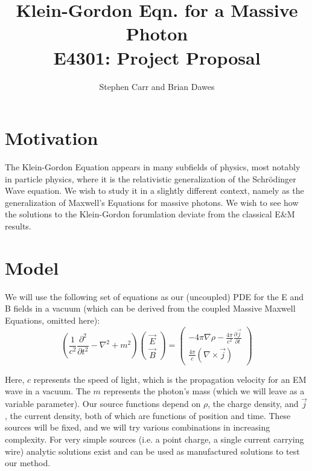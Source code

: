 \documentclass{article}
\begin{document}
\title{\vspace{-120 pt}\Large{Klein-Gordon Eqn. for a Massive Photon} \\ \vspace{0 pt} \large{E4301: Project Proposal}}
\author{Stephen Carr and Brian Dawes}
\maketitle

\section{Motivation}
The Klein-Gordon Equation appears in many subfields of physics, most notably in particle physics, where it is the relativistic generalization of the Schr\"odinger Wave equation. We wish to study it in a slightly different context, namely as the generalization of Maxwell's Equations for massive photons. We wish to see how the solutions to the Klein-Gordon forumlation deviate from the classical E\&M results.

\section{Model}
We will use the following set of equations as our (uncoupled) PDE for the E and B fields in a vacuum (which can be derived from the coupled Massive Maxwell Equations, omitted here):
\begin{equation}
\boxed{
\left(\frac{1}{c^2}\frac{\partial^2}{\partial t^2} - \nabla^2 + m^2\right)
\begin{pmatrix}
\vec{E} \\
\vec{B}
\end{pmatrix}
=
\begin{pmatrix}
-4\pi\nabla\rho - \frac{4\pi}{c^2}\frac{\partial\vec{j}}{\partial t} \\
\frac{4\pi}{c}(\nabla\times\vec{j})
\end{pmatrix}
}
\end{equation}

Here, $c$ represents the speed of light, which is the propagation velocity for an EM wave in a vacuum. The $m$ represents the photon's mass (which we will leave as a variable parameter). Our source functions depend on $\rho$, the charge density, and $\vec{j}$, the current density, both of which are functions of position and time. These sources will be fixed, and we will try various combinations in increasing complexity. For very simple sources (i.e. a point charge, a single current carrying wire) analytic solutions exist and can be used as manufactured solutions to test our method.
\end{document}

